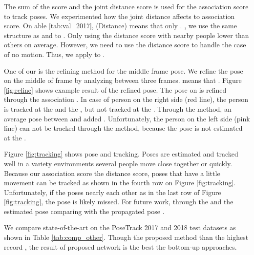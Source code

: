 \documentclass[conference]{IEEEtran}
\begin{document}
The sum of the 
score and the joint distance score is used for the association score to track poses. We experimented  how the joint distance affects to association score. On able \ref{tab:val_2017}, (Distance) means that only . , we use the same structure as 
and   to . 
Only using the distance score  with nearby people  lower than others on average. However, we need to use the distance score to handle the case of no motion. Thus, we apply  to  .



One of our  is the refining method for the middle frame pose. We refine the pose on the middle of frame by analyzing between three frames.  means that . 
Figure \ref{fig:refine} shows  example result of the refined pose. The pose on \nj{} is refined through the association . In case of  person on the right side (red line), the person is tracked at the  and the , but not tracked at the . Through the  method, an average pose between  and   added  . 
Unfortunately, the person on the left side (pink line) can not be tracked through the  method, because the pose is not estimated at the .  


Figure \ref{fig:tracking} shows  pose  and tracking. Poses are estimated and tracked well in a variety  environments  several people move close together or quickly. 
Because our association score  the distance score, poses that have a little movement can  be tracked as shown in the fourth row on Figure \ref{fig:tracking}.  
Unfortunately, if the poses nearly  each other as in the last row of Figure \ref{fig:tracking}, the pose is likely  missed. For future work,  through the 
and  the estimated pose  comparing  with the propagated pose .


We compare  state-of-the-art  on the PoseTrack 2017 and 2018 test datasets as shown in Table \ref{tab:comp_other}. Though the proposed method  than the highest record \cite{xiao2018simple}, the result of  proposed network is the best  the bottom-up approaches. 
\end{document}
